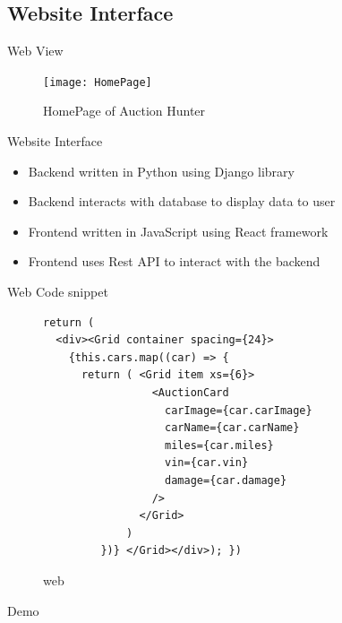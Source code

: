 \documentclass{beamer}
\begin{document}
\subsection{Website Interface}

\begin{frame}[fragile=singleslide]{Web View}
\begin{figure}[h]
\centering
\texttt{[image: HomePage]}
\caption{HomePage of Auction Hunter}
\label{fig:homepage}
\end{figure}
\end{frame}

\begin{frame}{Website Interface}
\begin{itemize}
    \setlength\itemsep{2em}
    \item Backend written in Python using Django library
    \item Backend interacts with database to display data to user
    \item Frontend written in JavaScript using React framework
    \item Frontend uses Rest API to interact with the backend
\end{itemize}
\end{frame}

\begin{frame}[fragile=singleslide]{Web Code snippet}
\begin{figure}[H]
\begin{verbatim}
return ( 
  <div><Grid container spacing={24}>
    {this.cars.map((car) => {
      return ( <Grid item xs={6}>
                 <AuctionCard
                   carImage={car.carImage}
                   carName={car.carName}
                   miles={car.miles}
                   vin={car.vin}
                   damage={car.damage}
                 />
               </Grid>
             )
         })} </Grid></div>); })
\end{verbatim}
\caption{web}
\end{figure}
\end{frame}

\begin{frame}[plain,c]

\begin{center}
\Huge Demo
\end{center}

\end{frame}
\end{document}
